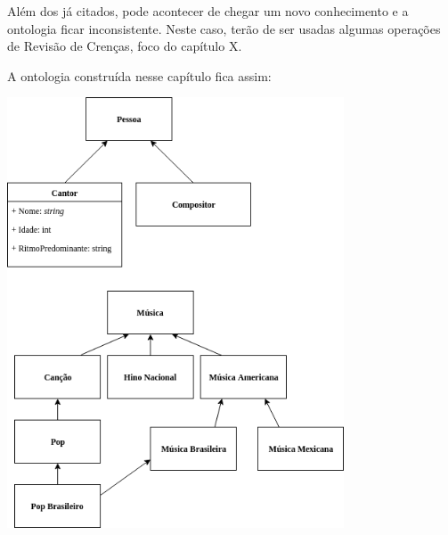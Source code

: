	Além dos já citados, pode acontecer de chegar um novo conhecimento e a ontologia ficar inconsistente. Neste caso, terão de ser usadas algumas operações de Revisão de Crenças, foco do capítulo {\color{red} X}.
	
	A ontologia construída nesse capítulo fica assim: 
	\begin{center}
		\includegraphics[width=10cm]{Capitulos/Ontologias/OntologiaMusica.png}
	\end{center}
	